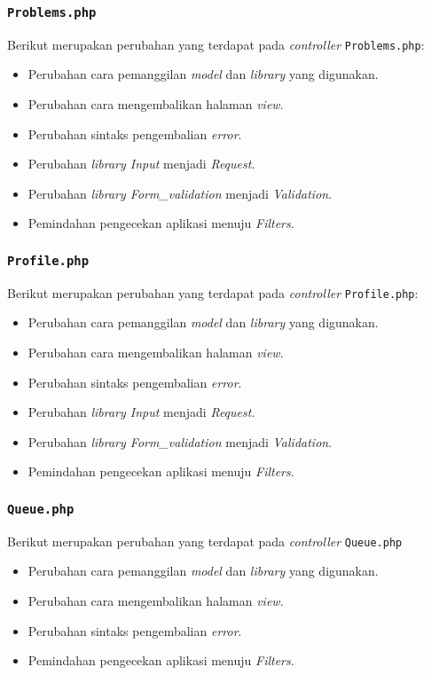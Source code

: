 \subsubsection{\texttt{Problems.php}}
Berikut merupakan perubahan yang terdapat pada \textit{controller} \texttt{Problems.php}:
\begin{itemize}
	\item Perubahan cara pemanggilan \textit{model} dan \textit{library} yang digunakan.
	\item Perubahan cara mengembalikan halaman \textit{view}.
	\item Perubahan sintaks pengembalian \textit{error}.
	\item Perubahan \textit{library Input} menjadi \textit{Request}.
	\item Perubahan \textit{library Form\_validation} menjadi \textit{Validation}.
	\item Pemindahan pengecekan aplikasi menuju \textit{Filters}.
\end{itemize}
\subsubsection{\texttt{Profile.php}}
Berikut merupakan perubahan yang terdapat pada \textit{controller} \texttt{Profile.php}:
\begin{itemize}
	\item Perubahan cara pemanggilan \textit{model} dan \textit{library} yang digunakan.
	\item Perubahan cara mengembalikan halaman \textit{view}.
	\item Perubahan sintaks pengembalian \textit{error}.
	\item Perubahan \textit{library Input} menjadi \textit{Request}.
	\item Perubahan \textit{library Form\_validation} menjadi \textit{Validation}.
	\item Pemindahan pengecekan aplikasi menuju \textit{Filters}.
\end{itemize}
\subsubsection{\texttt{Queue.php}}
Berikut merupakan perubahan yang terdapat pada \textit{controller} \texttt{Queue.php}
\begin{itemize}
	\item Perubahan cara pemanggilan \textit{model} dan \textit{library} yang digunakan.
	\item Perubahan cara mengembalikan halaman \textit{view}.
	\item Perubahan sintaks pengembalian \textit{error}.
	\item Pemindahan pengecekan aplikasi menuju \textit{Filters}.
\end{itemize}
